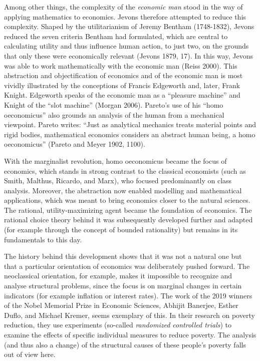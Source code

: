 \documentclass[
  british,
  a4paper,
  DIV=11,
  numbers=noendperiod,
  oneside,
  openany]{scrreprt}
\begin{document}
\begin{tcolorbox}
Among other things, the complexity of the \emph{economic man} stood in
the way of applying mathematics to economics. Jevons therefore attempted
to reduce this complexity. Shaped by the utilitarianism of Jeremy
Bentham (1748-1832), Jevons reduced the seven criteria Bentham had
formulated, which are central to calculating utility and thus influence
human action, to just two, on the grounds that only these were
economically relevant (Jevons 1879, 17). In this way, Jevons was able to
work mathematically with the economic man (Reiss 2000). This abstraction
and objectification of economics and of the economic man is most vividly
illustrated by the conceptions of Francis Edgeworth and, later, Frank
Knight. Edgeworth speaks of the economic man as a ``pleasure machine''
and Knight of the ``slot machine'' (Morgan 2006). Pareto's use of his
``homo oeconomicus'' also grounds an analysis of the human from a
mechanical viewpoint. Pareto writes: ``Just as analytical mechanics
treats material points and rigid bodies, mathematical economics
considers an abstract human being, a homo oeconomicus'' (Pareto and
Meyer 1902, 1100).

With the marginalist revolution, homo oeconomicus became the focus of
economics, which stands in strong contrast to the classical economists
(such as Smith, Malthus, Ricardo, and Marx), who focused predominantly
on class analysis. Moreover, the abstraction now enabled modelling and
mathematical applications, which was meant to bring economics closer to
the natural sciences. The rational, utility-maximizing agent became the
foundation of economics. The rational choice theory behind it was
subsequently developed further and adapted (for example through the
concept of bounded rationality) but remains in its fundamentals to this
day.

The history behind this development shows that it was not a natural one
but that a particular orientation of economics was deliberately pushed
forward. The neoclassical orientation, for example, makes it impossible
to recognize and analyse structural problems, since the focus is on
marginal changes in certain indicators (for example inflation or
interest rates). The work of the 2019 winners of the Nobel Memorial
Prize in Economic Sciences, Abhijit Banerjee, Esther Duflo, and Michael
Kremer, seems exemplary of this. In their research on poverty reduction,
they use experiments (so-called \emph{randomized controlled trials}) to
examine the effects of specific individual measures to reduce poverty.
The analysis (and thus also a change) of the structural causes of these
people's poverty falls out of view here.


\end{tcolorbox}
\end{document}
